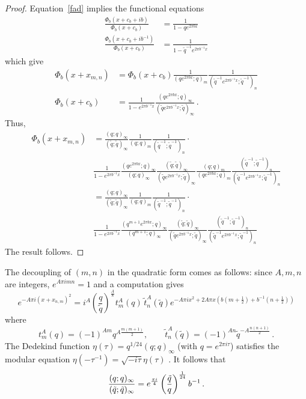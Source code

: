 \documentclass[12pt]{amsart}
\theoremstyle{definition}
\def\printname#1{
        \if\draft y
                \smash{\makebox[0pt]{\hspace{-0.5in}
                        \raisebox{8pt}{\tt\tiny #1}}}
        \fi
}
\def\lbl#1{\label{#1}\printname{#1}}
\def\ti{\widetilde}
\def\tq{\tilde{q}}
\begin{document}
\begin{proof}
Equation~\eqref{fad} implies the functional equations
\begin{align*}
\frac{\Phi_b(x+c_b+ib)}{\Phi_b(x+c_b)} &= \frac{1}{1-q e^{2 \pi b x}} 
\\
\frac{\Phi_b(x+c_b+ib^{-1})}{\Phi_b(x+c_b)} &= 
\frac{1}{1-\tq^{-1} e^{2 \pi b^{-1} x}} 
\end{align*}
which give 
\begin{align*}
\Phi_b(x+ x_{m,n})&=\Phi_b(x+c_b) 
\frac{1}{(q e^{2 \pi b x};q)_m}
\frac{1}{(\tq^{-1} e^{2 \pi b^{-1} x};\tq^{-1})_n} \\
\Phi_b(x+c_b)&=\frac{1}{1-e^{2 \pi b^{-1}x}} 
\frac{(q e^{2 \pi b x};q)_\infty}{(\tq e^{2 \pi b^{-1} x};\tq)_\infty} \,.
\end{align*}
Thus,
\begin{align*}
\Phi_b(x+x_{m,n})&=
\frac{(q;q)_\infty}{(\tq;\tq)_\infty}
\frac{1}{(q;q)_m}
\frac{1}{(\tq^{-1};\tq^{-1})_n} \cdot \\
& \frac{1}{1-e^{2 \pi b^{-1}x}}
\frac{(q e^{2 \pi b x};q)_\infty}{(q;q)_\infty}
\frac{(\tq;\tq)_\infty}{(\tq e^{2 \pi b^{-1} x};\tq)_\infty}
\frac{(q;q)_m}{(q e^{2 \pi b x};q)_m}
\frac{(\tq^{-1};\tq^{-1})_n}{(\tq^{-1} e^{2 \pi b^{-1} x};\tq^{-1})_n} 
\\
&=
\frac{(q;q)_\infty}{(\tq;\tq)_\infty}
\frac{1}{(q;q)_m}
\frac{1}{(\tq^{-1};\tq^{-1})_n} \cdot \\
& \frac{1}{1-e^{2 \pi b^{-1}x}}
\frac{(q^{m+1} e^{2 \pi b x};q)_\infty}{(q^{m+1};q)_\infty}
\frac{(\tq;\tq)_\infty}{(\tq e^{2 \pi b^{-1} x};\tq)_\infty}
\frac{(\tq^{-1};\tq^{-1})_n}{(\tq^{-1} e^{2 \pi b^{-1} x};\tq^{-1})_n}
\end{align*}
The result follows.
\end{proof}
The decoupling of $(m,n)$ in the quadratic form comes as follows:
since $A,m,n$ are integers, $e^{A \pi i m n}=1$ and a computation gives
$$
e^{-A \pi i (x+ x_{n,m})^2}=
i^A \left(\frac{q}{\tq}\right)^{\frac{A}{8}} 
t^A_m(q) \, \ti t^A_n(\tq) e^{- A \pi i x^2 +2 A \pi x 
\left(b (m+\frac{1}{2}) + b^{-1} (n+\frac{1}{2})\right)}
$$
where
$$
t^A_m(q) = (-1)^{A m} q^{A \frac{m(m+1)}{2}}, \qquad
\ti t^A_n(\tq) = (-1)^{A n} \tq^{-A \frac{n(n+1)}{2}} \,.
$$
The Dedekind function $\eta(\tau)=q^{1/24}(q;q)_\infty$ (with $q=e^{2\pi i\tau}$)
satisfies the modular equation 
$\eta(-\tau^{-1})=\sqrt{-i\tau}\eta(\tau)$ \cite{Andrews}.
It follows that 
\begin{equation}
\lbl{eq.etaf}
\frac{(q;q)_\infty}{(\tq;\tq)_\infty}=e^{\frac{\pi i}{4}} 
\left(\frac{\tq}{q}\right)^{\frac{1}{24}} b^{-1} \,.
\end{equation}
\end{document}
